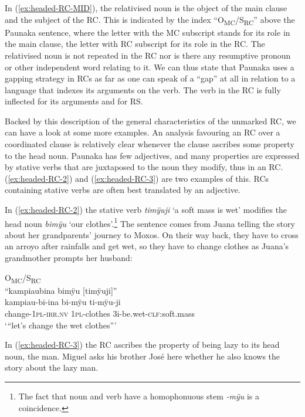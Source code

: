 In (\ref{ex:headed-RC-MID}), the relativised noun is the object  of the main clause and the subject of the RC. This is indicated by the index “\textup{O\textsubscript{MC}/S\textsubscript{RC}}” above the Paunaka sentence, where the letter with the MC subscript stands for its role in the main clause, the letter with RC subscript for its role in the RC. The relativised noun is not repeated in the RC nor is there any resumptive pronoun or other independent word relating to it. We can thus state that Paunaka uses a gapping strategy in RCs as far as one can speak of a “gap” at all in relation to a language that indexes its arguments on the verb. The verb in the RC is fully inflected for its arguments and for RS.

Backed by this description of the general characteristics of the unmarked RC, we can have a look at some more examples. An analysis favouring an RC over a coordinated clause is relatively clear whenever the clause ascribes some property to the head noun. Paunaka has few adjectives, and many properties are expressed by stative verbs that are juxtaposed to the noun they modify, thus in an RC. (\ref{ex:headed-RC-2}) and (\ref{ex:headed-RC-3}) are two examples of this. RCs containing stative verbs are often best translated by an adjective.

In (\ref{ex:headed-RC-2}) the stative verb \textit{timÿuji} ‘a soft mass is wet’ modifies the head noun \textit{bimÿu} ‘our clothes’.\footnote{The fact that noun and verb have a homophonuous stem \textit{-mÿu} is a coincidence.} The sentence comes from Juana telling the story about her grandparents’ journey to Moxos. On their way back, they have to cross an arroyo after rainfalls and get wet, so they have to change clothes as Juana’s grandmother prompts her husband:

\ea\label{ex:headed-RC-2}
\begingl
\glpreamble\textup{O\textsubscript{MC}/S\textsubscript{RC}}\\“kampiaubina bimÿu \textup{[}timÿuji\textup{]}” \\
\gla kampiau-bi-ina bi-mÿu ti-mÿu-ji\\
\glb change-1\textsc{pl}-\textsc{irr.nv} 1\textsc{pl}-clothes 3i-be.wet-\textsc{clf:}soft.mass\\
\glft ‘“let’s change the wet clothes”’
\endgl
\trailingcitation{[jxx-p151016l-2.128]}
\xe

In (\ref{ex:headed-RC-3}) the RC ascribes the property of being lazy to its head noun, the man. Miguel asks his brother José here whether he also knows the story about the lazy man. 

